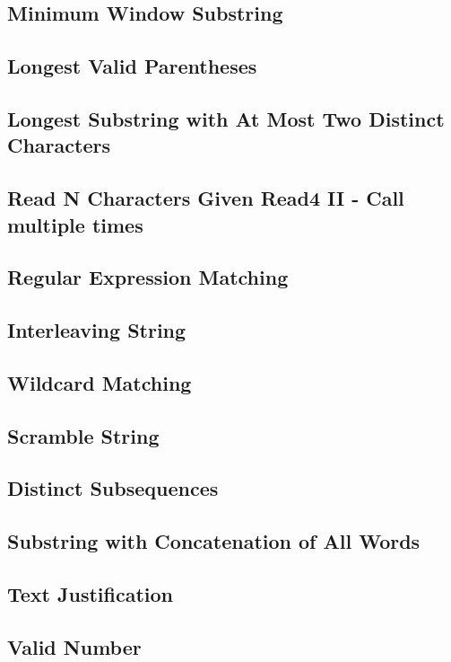 \documentclass[11pt]{book}
\begin{document}
\subsection{Minimum Window Substring}
\label{sec-2-3-2}
\subsection{Longest Valid Parentheses}
\label{sec-2-3-3}
\subsection{Longest Substring with At Most Two Distinct Characters}
\label{sec-2-3-4}
\subsection{Read N Characters Given Read4 II - Call multiple times}
\label{sec-2-3-5}
\subsection{Regular Expression Matching}
\label{sec-2-3-6}
\subsection{Interleaving String}
\label{sec-2-3-7}
\subsection{Wildcard Matching}
\label{sec-2-3-8}
\subsection{Scramble String}
\label{sec-2-3-9}
\subsection{Distinct Subsequences}
\label{sec-2-3-10}
\subsection{Substring with Concatenation of All Words}
\label{sec-2-3-11}
\subsection{Text Justification}
\label{sec-2-3-12}
\subsection{Valid Number}
\label{sec-2-3-13}
\end{document}
